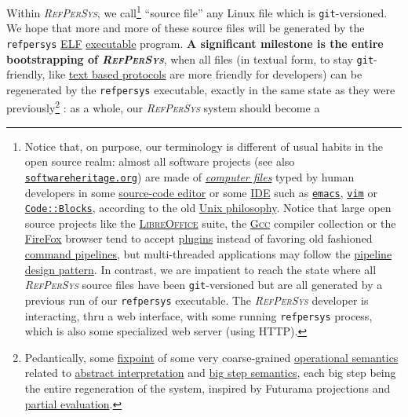 \documentclass[11pt,a4paper,svgnames]{article}
\newcommand{\RefPerSys}{{\textit{\textsc{RefPerSys}}}}
\begin{document}
Within {\RefPerSys}, we call\footnote{Notice that, on purpose, our
terminology is different of usual habits in the open source realm:
almost all software projects (see also
\href{http://softwareheritage.org}{\texttt{softwareheritage.org}}) are
made of
\href{https://en.wikipedia.org/wiki/Computer\_file}{\textit{computer
    files}} typed by human developers in some
\href{https://en.wikipedia.org/wiki/Source-code\_editor}{source-code
  editor} or some
\href{https://en.wikipedia.org/wiki/Integrated\_development\_environment}{IDE}
such as \href{https://www.gnu.org/software/emacs/}{\texttt{emacs}},
\href{http://vim.org/}{\texttt{vim}} or
\href{http://codeblocks.org/}{\texttt{Code::Blocks}}, according to the
old \href{https://en.wikipedia.org/wiki/Unix\_philosophy}{Unix
  philosophy}. Notice that large open source projects like the
\href{https://www.libreoffice.org/}{\textsc{LibreOffice}} suite, the
\href{http://gcc.gnu.org}{\textsc{Gcc}} compiler collection or the
\href{https://www.mozilla.org/en-US/firefox/}{FireFox} browser tend to
accept
\href{https://en.wikipedia.org/wiki/Plug-in_(computing)}{plugins}
instead of favoring old fashioned
\href{https://en.wikipedia.org/wiki/Pipeline_(Unix)}{command
  pipelines}, but multi-threaded applications may follow the
\href{https://en.wikipedia.org/wiki/Pipeline_(software)}{pipeline
  design pattern}. In contrast, we are impatient to reach the state
where all {\RefPerSys} source files have been \texttt{git}-versioned
but are all generated by a previous run of our \texttt{refpersys}
executable. The {\RefPerSys} developer is interacting, thru a web
interface, with some running \texttt{refpersys} process, which is also some
specialized web server (using  HTTP).}  ``source file'' any Linux file which is
\texttt{git}-versioned. We hope that more and more of these source
files will be generated by the \texttt{refpersys}
\href{https://en.wikipedia.org/wiki/Executable\_and\_Linkable_Format}{ELF}
\href{https://en.wikipedia.org/wiki/Executable}{executable}
program. \textbf{A significant milestone is the entire bootstrapping
  of \RefPerSys}, when all files (in textual form, to stay
\texttt{git}-friendly, like
\href{https://en.wikipedia.org/wiki/Text-based_protocol}{text based
  protocols} are more friendly for developers) can be regenerated by
the \texttt{refpersys} executable, exactly in the same state as they
were previously\footnote{Pedantically, some
\href{https://en.wikipedia.org/wiki/Fixed\_point\_(mathematics)}{fixpoint}
of some very coarse-grained
\href{https://en.wikipedia.org/wiki/Operational\_semantics}{operational
  semantics} related to
\href{https://en.wikipedia.org/wiki/Abstract\_interpretation}{abstract
  interpretation} and
\href{https://en.wikipedia.org/wiki/Operational\_semantics\#Structural\_operational\_semantics}{big
  step semantics}, each big step being the entire regeneration of the
system, inspired by Futurama projections and
\href{https://en.wikipedia.org/wiki/Partial\_evaluation}{partial
  evaluation}.} : as a whole, our {\RefPerSys} system should become a
\end{document}
